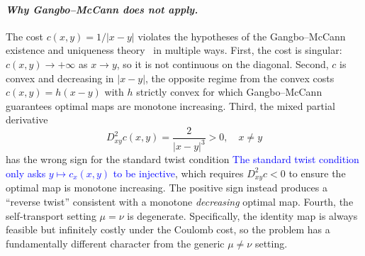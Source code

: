 \documentclass[12pt,leqno]{amsart}
\newcommand{\zihe}[1]{\textcolor{blue}{#1}}
\begin{document}
\paragraph{\it Why Gangbo--McCann does not apply.}
The cost $c(x,y) = 1/|x-y|$ violates the hypotheses of the Gangbo--McCann existence and uniqueness theory~\citep{GangboMcCann1996} in multiple ways. First, the cost is singular: $c(x,y) \to +\infty$ as $x \to y$, so it is not continuous on the diagonal. Second, $c$ is convex and decreasing in $|x-y|$, the opposite regime from the convex costs $c(x,y) = h(x-y)$ with $h$ strictly convex for which Gangbo--McCann guarantees optimal maps are monotone increasing. Third, the mixed partial derivative
\[
    D^2_{xy} c(x,y) = \frac{2}{|x-y|^3} > 0,\quad x\neq y
\]
has the wrong sign for the standard twist condition \zihe{The standard twist condition only asks $y\mapsto c_x(x,y)$ to be injective\citep[Definition 1.16]{Santambrogio2015}}, which requires $D^2_{xy}c < 0$ to ensure the optimal map is monotone increasing. The positive sign instead produces a ``reverse twist'' consistent with a monotone \emph{decreasing} optimal map. Fourth, the self-transport setting $\mu = \nu$ is degenerate. Specifically, the identity map is always feasible but infinitely costly under the Coulomb cost, so the problem has a fundamentally different character from the generic $\mu \neq \nu$ setting.
\end{document}

